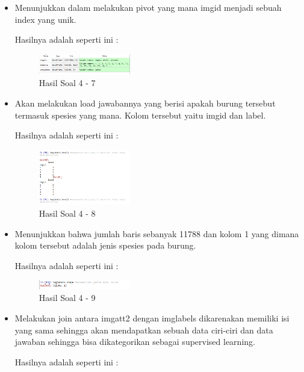 \begin{enumerate}
\begin{itemize}
	\item Menunjukkan dalam melakukan pivot yang mana imgid menjadi sebuah index yang unik.
	
	Hasilnya adalah seperti ini :

	\begin{figure}[H]
	\centering
		\includegraphics[width=4cm]{figures/1174096/tugas3/hasil47.PNG}
		\caption{Hasil Soal 4 - 7}
	\end{figure}

	\item Akan melakukan load jawabannya yang berisi apakah burung tersebut termasuk spesies yang mana. Kolom tersebut yaitu imgid dan label.
	
	Hasilnya adalah seperti ini :

	\begin{figure}[H]
	\centering
		\includegraphics[width=4cm]{figures/1174096/tugas3/hasil48.PNG}
		\caption{Hasil Soal 4 - 8}
	\end{figure}

	\item Menunjukkan bahwa jumlah baris sebanyak 11788 dan kolom 1 yang dimana kolom tersebut adalah jenis spesies pada burung.
	
	Hasilnya adalah seperti ini :

	\begin{figure}[H]
	\centering
		\includegraphics[width=4cm]{figures/1174096/tugas3/hasil49.PNG}
		\caption{Hasil Soal 4 - 9}
	\end{figure}

	\item Melakukan join antara imgatt2 dengan imglabels dikarenakan memiliki isi yang sama sehingga akan mendapatkan sebuah data ciri-ciri dan data jawaban sehingga bisa dikategorikan sebagai supervised learning.
	
	Hasilnya adalah seperti ini :


\end{itemize}
\end{enumerate}
